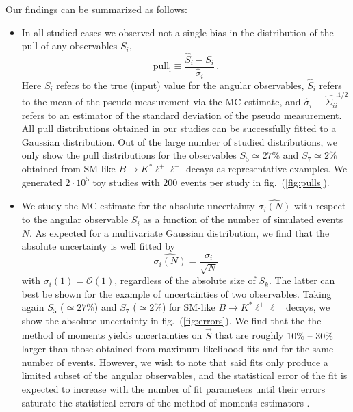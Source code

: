 \documentclass[aps,nofootinbib,preprintnumbers,prd,twocolumn]{revtex4-1}
\newcommand{\est}[1]{\widehat{#1}}
\newcommand{\order}[1]{\mathcal{O}\left({#1}\right)}
\newcommand{\reffig}[1]{fig.~(\ref{fig:#1})}
\begin{document}
Our findings can be summarized as follows:
\begin{itemize}
    \item In all studied cases we observed not a single bias in the distribution of the $\mathrm{pull}$
        of any observables $S_i$,
        \begin{equation}
            \mathrm{pull_i} \equiv \frac{\est{S}_i - S_i}{\est{\sigma}_{i}}\,.
        \end{equation}
        Here $S_i$ refers to the true (input) value for the angular observables, $\est{S}_i$ refers to the
        mean of the pseudo measurement via the MC estimate, and $\est{\sigma}_{i} \equiv \est{\Sigma_{ii}}^{1/2}$
        refers to an estimator of the standard deviation of the pseudo measurement. All pull distributions
        obtained in our studies can be successfully
        fitted to a Gaussian distribution. Out of the large number  of studied distributions, we only show the pull distributions for the observables
        $S_5 \simeq 27\%$ and $S_7 \simeq 2\%$ obtained from SM-like $B\to K^*\ell^+\ell^-$
        decays as representative examples. We generated $2\cdot 10^5$ toy studies
        with $200$ events per study in \reffig{pulls}.

    \item We study the MC estimate for the absolute uncertainty $\est{\sigma_i(N)}$ with respect to the angular observable $S_i$
        as a function of the number of simulated events $N$. As expected for a multivariate Gaussian
        distribution, we find that the absolute uncertainty is well fitted by
        \begin{equation}
            \label{eq:unc-on-mean}
            \est{\sigma_i(N)} = \frac{\sigma_i}{\sqrt{N}}
        \end{equation}
        with $\sigma_i(1) = \order{1}$, regardless of the absolute size of $S_k$. The latter can best be shown
        for the example of uncertainties of two observables. Taking again $S_5$ ($\simeq 27\%$) and $S_7$ ($\simeq 2\%$)
        for SM-like $B\to K^*\ell^+\ell^-$ decays, we show the absolute uncertainty in \reffig{errors}.
        We find that the the method of moments yields uncertainties on $\vec{S}$ that are roughly
        $10\%$ -- $30\%$ larger than those obtained from maximum-likelihood fits and for the same
        number of events. However, we wish to note that said fits only produce a limited
        subset of the angular observables, and the statistical error of the fit is expected to increase
        with the number of fit parameters until their errors saturate the statistical errors of the method-of-moments
        estimators \cite[sec. 8]{Cowan:1998ji}.


\end{itemize}
\end{document}
